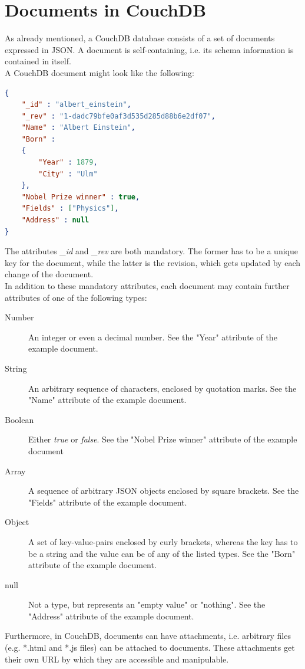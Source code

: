 \section{Documents in CouchDB}
\label{couchdb:documents}
As already mentioned, a CouchDB database consists of a set of documents expressed in JSON. A document is self-containing, i.e. its schema information is contained in itself.\\
A CouchDB document might look like the following:
\begin{lstlisting}[language=json]
{
	"_id" : "albert_einstein",
	"_rev" : "1-dadc79bfe0af3d535d285d88b6e2df07",
	"Name" : "Albert Einstein",
	"Born" : 
	{
		"Year" : 1879, 
		"City" : "Ulm"
	},
	"Nobel Prize winner" : true,
	"Fields" : ["Physics"],
	"Address" : null
}
\end{lstlisting}
The attributes \emph{\_id} and \emph{\_rev} are both mandatory. The former has to be a unique key for the document, while the latter is the revision, which gets updated by each change of the document.\\
In addition to these mandatory attributes, each document may contain further attributes of one of the following types:
\begin{description}
\item[Number] An integer or even a decimal number. See the "Year" attribute of the example document.
\item[String] An arbitrary sequence of characters, enclosed by quotation marks. See the "Name" attribute of the example document.
\item[Boolean] Either \emph{true} or \emph{false}. See the "Nobel Prize winner" attribute of the example document
\item[Array] A sequence of arbitrary JSON objects enclosed by square brackets. See the "Fields" attribute of the example document.
\item[Object] A set of key-value-pairs enclosed by curly brackets, whereas the key has to be a string and the value can be of any of the listed types. See the "Born" attribute of the example document.
\item[null] Not a type, but represents an "empty value" or "nothing". See the "Address" attribute of the example document.
\end{description}
Furthermore, in CouchDB, documents can have attachments, i.e. arbitrary files (e.g. *.html and *.js files) can be attached to documents. These attachments get their own URL by which they are accessible and manipulable.

